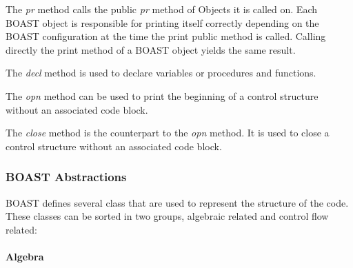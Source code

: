 \documentclass[11pt, a4paper, twoside]{montblanc}
\begin{document}
The \emph{pr} method calls the public \emph{pr} method of Objects it is
called on. Each BOAST object is responsible for printing itself correctly
depending on the BOAST configuration at the time the print public method is
called. Calling directly the print method of a BOAST object yields the same
result.

The \emph{decl} method is used to declare variables or procedures and functions.

The \emph{opn} method can be used to print the beginning of a control
structure without an associated code block.

The \emph{close} method is the counterpart to the \emph{opn} method. It is used
to close a control structure without an associated code block.

    \subsubsection{BOAST Abstractions}

BOAST defines several class that are used to represent the structure of the
code. These classes can be sorted in two groups, algebraic related and control
flow related:

      \paragraph{Algebra}
\end{document}
